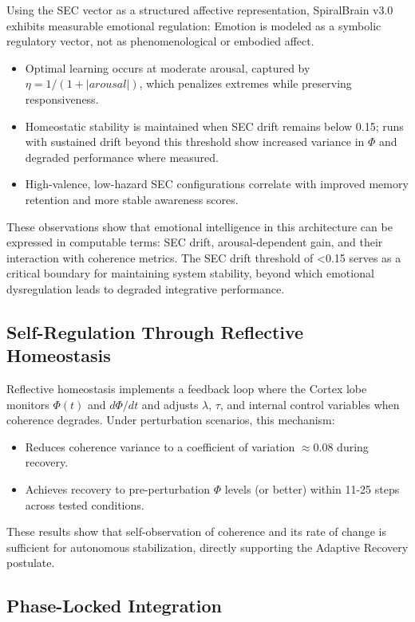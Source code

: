 \documentclass[11pt,a4paper]{article}
\begin{document}
Using the SEC vector as a structured affective representation, SpiralBrain v3.0 exhibits measurable emotional regulation: Emotion is modeled as a symbolic regulatory vector, not as phenomenological or embodied affect.
\begin{itemize}[leftmargin=2em]
    \item Optimal learning occurs at moderate arousal, captured by \( \eta = 1/(1 + |arousal|) \), which penalizes extremes while preserving responsiveness.
    \item Homeostatic stability is maintained when SEC drift remains below 0.15; runs with sustained drift beyond this threshold show increased variance in \( \Phi \) and degraded performance where measured.
    \item High-valence, low-hazard SEC configurations correlate with improved memory retention and more stable awareness scores.
\end{itemize}
These observations show that emotional intelligence in this architecture can be expressed in computable terms: SEC drift, arousal-dependent gain, and their interaction with coherence metrics. The SEC drift threshold of <0.15 serves as a critical boundary for maintaining system stability, beyond which emotional dysregulation leads to degraded integrative performance.

\subsection{Self-Regulation Through Reflective Homeostasis}

Reflective homeostasis implements a feedback loop where the Cortex lobe monitors \( \Phi(t) \) and \( d\Phi/dt \) and adjusts \( \lambda \), \( \tau \), and internal control variables when coherence degrades. Under perturbation scenarios, this mechanism:
\begin{itemize}[leftmargin=2em]
    \item Reduces coherence variance to a coefficient of variation \( \approx 0.08 \) during recovery.
    \item Achieves recovery to pre-perturbation \( \Phi \) levels (or better) within 11-25 steps across tested conditions.
\end{itemize}
These results show that self-observation of coherence and its rate of change is sufficient for autonomous stabilization, directly supporting the Adaptive Recovery postulate.

\subsection{Phase-Locked Integration}
\end{document}
